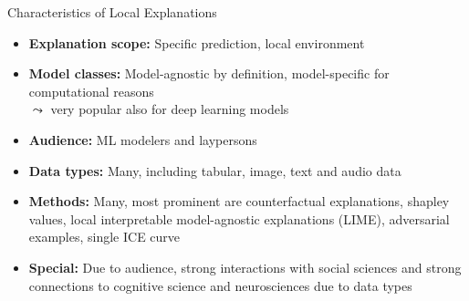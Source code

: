 \documentclass[11pt,compress,t,notes=noshow, aspectratio=169, xcolor=table]{beamer}
\begin{document}
\begin{vbframe}[c]{Characteristics of Local Explanations}
	\begin{itemize}[<+->]
		\item \textbf{Explanation scope:} Specific prediction, local environment
		\item \textbf{Model classes:} Model-agnostic by definition, model-specific for computational reasons\\
		$\leadsto$ very popular also for deep learning models
		\item \textbf{Audience:} ML modelers and laypersons
		\item \textbf{Data types:} Many, including tabular, image, text and audio data
		\item \textbf{Methods:} Many, most prominent are counterfactual explanations, shapley values, local interpretable model-agnostic explanations (LIME), adversarial examples, single ICE curve%
		\item \textbf{Special:} Due to audience, strong interactions with social sciences and strong connections to cognitive science and neurosciences due to data types
	\end{itemize}
\end{vbframe}

\end{document}
